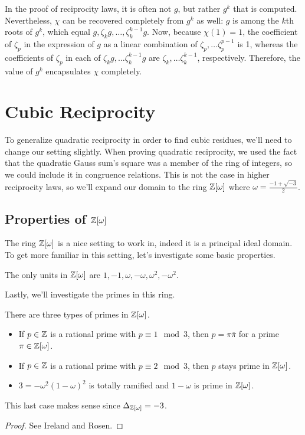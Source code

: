 \documentclass[utf8, letterpaper]{article}
\begin{document}
In the proof of reciprocity laws, it is often not $g$, but rather $g^k$ that is computed. Nevertheless, $\chi$ can be recovered completely from $g^k$ as well: $g$ is among the $k$th roots of $g^k$, which equal $g, \zeta_k g, \ldots, \zeta^{k-1}_k g$. Now, because $\chi(1)=1$, the coefficient of $\zeta_p$ in the expression of $g$ as a linear combination of $\zeta_p, \ldots \zeta^{p-1}_p$ is 1, whereas the coefficients of $\zeta_p$ in each of $\zeta_kg, \ldots \zeta_k^{k-1}g$ are $\zeta_k, \ldots \zeta_k^{k-1}$, respectively. Therefore, the value of $g^k$ encapsulates $\chi$ completely.

\section{Cubic Reciprocity}

To generalize quadratic reciprocity in order to find cubic residues, we'll need to change our setting slightly. When proving quadratic reciprocity, we used the fact that the quadratic Gauss sum's square was a member of the ring of integers, so we could include it in congruence relations. This is not the case in higher reciprocity laws, so we'll expand our domain to the ring $\mathbb{Z}[\omega]$ where $\omega=\frac{-1+\sqrt{-3}}{2}$. 

\subsection{Properties of $\mathbb{Z}[\omega]$}

The ring $\mathbb{Z}[\omega]$ is a nice setting to work in, indeed it is a principal ideal domain. To get more familiar in this setting, let's investigate some basic properties.

\begin{proposition}
    The only units in $\mathbb{Z}[\omega]$ are $1,-1,\omega, -\omega, \omega^2, -\omega^2$.
\end{proposition}

Lastly, we'll investigate the primes in this ring.

\begin{proposition}
    There are three types of primes in $\mathbb{Z}[\omega]$.
    \begin{itemize}
        \item If $p\in \mathbb{Z}$ is a rational prime with $p\equiv 1\mod 3$, then $p=\pi\overline{\pi}$ for a prime $\pi\in \mathbb{Z}[\omega]$.
        \item If $p\in \mathbb{Z}$ is a rational prime with $p\equiv 2\mod 3$, then $p$ stays prime in $\mathbb{Z}[\omega]$.
        \item $3=-\omega^2(1-\omega)^2$ is totally ramified and $1-\omega$ is prime in $\mathbb{Z}[\omega]$. 
    \end{itemize}
    This last case makes sense since $\Delta_{\mathbb{Z}[\omega]}=-3$.
\end{proposition}
\begin{proof}
    See Ireland and Rosen.
\end{proof}
\end{document}
